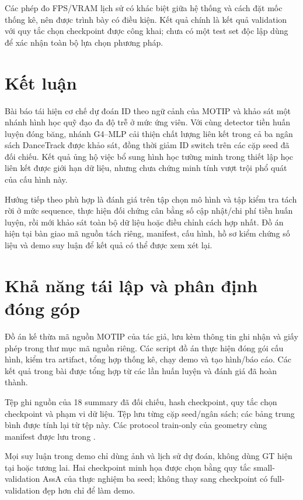 Các phép đo FPS/VRAM lịch sử có khác biệt giữa hệ thống và cách đặt mốc thống kê, nên được trình bày có điều kiện. Kết quả chính là kết quả validation với quy tắc chọn checkpoint được công khai; chưa có một test set độc lập dùng để xác nhận toàn bộ lựa chọn phương pháp.

\FloatBarrier
\section{Kết luận}
Bài báo tái hiện cơ chế dự đoán ID theo ngữ cảnh của MOTIP và khảo sát một nhánh hình học quỹ đạo đa độ trễ ở mức ứng viên. Với cùng detector tiền huấn luyện đóng băng, nhánh G4–MLP cải thiện chất lượng liên kết trong cả ba ngân sách DanceTrack được khảo sát, đồng thời giảm ID switch trên các cặp seed đã đối chiếu. Kết quả ủng hộ việc bổ sung hình học tường minh trong thiết lập học liên kết được giới hạn dữ liệu, nhưng chưa chứng minh tính vượt trội phổ quát của cấu hình này.

Hướng tiếp theo phù hợp là đánh giá trên tập chọn mô hình và tập kiểm tra tách rời ở mức sequence, thực hiện đối chứng cân bằng số cập nhật/chi phí tiền huấn luyện, rồi mới khảo sát toàn bộ dữ liệu hoặc điều chỉnh cách hợp nhất. Đồ án hiện tại bàn giao mã nguồn tách riêng, manifest, cấu hình, hồ sơ kiểm chứng số liệu và demo suy luận để kết quả có thể được xem xét lại.

\FloatBarrier
\clearpage\appendix
\FloatBarrier
\section{Khả năng tái lập và phân định đóng góp}
Đồ án kế thừa mã nguồn MOTIP của tác giả, lưu kèm thông tin ghi nhận và giấy phép trong thư mục mã nguồn riêng. Các script đồ án thực hiện đóng gói cấu hình, kiểm tra artifact, tổng hợp thống kê, chạy demo và tạo hình/báo cáo. Các kết quả trong bài được tổng hợp từ các lần huấn luyện và đánh giá đã hoàn thành.

Tệp  ghi nguồn của 18 summary đã đối chiếu, hash checkpoint, quy tắc chọn checkpoint và phạm vi dữ liệu. Tệp  lưu từng cặp seed/ngân sách; các bảng trung bình được tính lại từ tệp này. Các protocol train-only của geometry cùng manifest được lưu trong .

Mọi suy luận trong demo chỉ dùng ảnh và lịch sử dự đoán, không dùng GT hiện tại hoặc tương lai. Hai checkpoint minh họa được chọn bằng quy tắc small-validation AssA của thực nghiệm ba seed; không thay sang checkpoint có full-validation đẹp hơn chỉ để làm demo.

